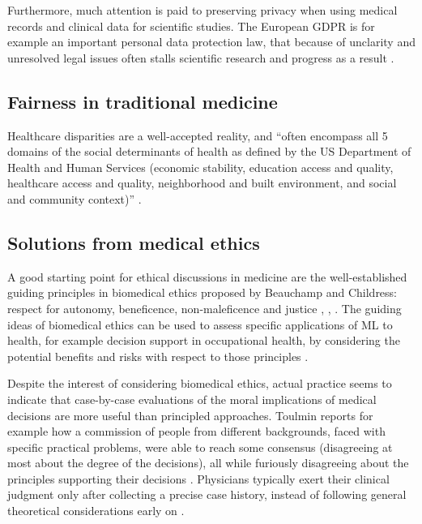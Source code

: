     Furthermore, much attention is paid to preserving privacy when using medical records and clinical data for scientific studies.
    The European GDPR is for example an important personal data protection law, that because of unclarity and unresolved legal issues often stalls scientific research and progress as a result \cite{Eiss2020}.


\subsection{Fairness in traditional medicine}
    Healthcare disparities are a well-accepted reality, and ``often encompass all 5 domains of the social determinants of health as defined by the US Department of Health and Human Services (economic stability, education access and quality, healthcare access and quality, neighborhood and built environment, and social and community context)'' \cite[p.~2]{Chen2021}.


\subsection{Solutions from medical ethics}
    A good starting point for ethical discussions in medicine are the well-established guiding principles in biomedical ethics proposed by Beauchamp and Childress: respect for autonomy, beneficence, non-maleficence and justice \cite[pp.~344-345]{Dijkstra2020}, \cite[p.~2]{Morley2020}, \cite[p.~2]{Rajkomar2018}.
    The guiding ideas of biomedical ethics can be used to assess specific applications of ML to health, for example decision support in occupational health, by considering the potential benefits and risks with respect to those principles \cite{Dijkstra2020}.

    Despite the interest of considering biomedical ethics, actual practice seems to indicate that case-by-case evaluations of the moral implications of medical decisions are more useful than principled approaches.
    Toulmin reports for example how a commission of people from different backgrounds, faced with specific practical problems, were able to reach some consensus (disagreeing at most about the degree of the decisions), all while furiously disagreeing about the principles supporting their decisions \cite{Toulmin1982}.
    Physicians typically exert their clinical judgment only after collecting a precise case history, instead of following general theoretical considerations early on \cite{Toulmin1982}.
